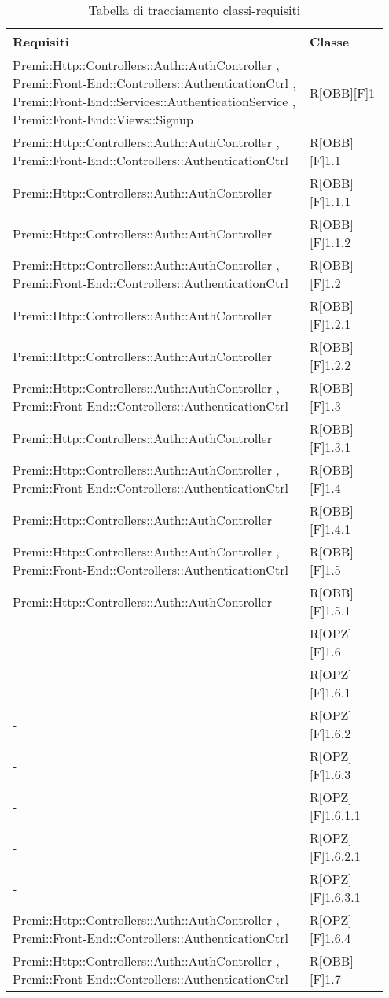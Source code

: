 \newpage
\begin{table}[h]
	\caption{Tabella di tracciamento classi-requisiti}
	\begin{center}
		\begin{tabular}{|p{0.75\linewidth}|p{0.2\linewidth}|}
			\toprule
			\textbf{Requisiti} & \textbf{Classe}\\
		\midrule
			 Premi::Http::Controllers::Auth::AuthController , Premi::Front-End::Controllers::AuthenticationCtrl , Premi::Front-End::Services::AuthenticationService , Premi::Front-End::Views::Signup & R[OBB][F]1 \\
		\midrule
			 Premi::Http::Controllers::Auth::AuthController , Premi::Front-End::Controllers::AuthenticationCtrl & R[OBB][F]1.1 \\
		\midrule
			Premi::Http::Controllers::Auth::AuthController & R[OBB][F]1.1.1 \\
		\midrule
			Premi::Http::Controllers::Auth::AuthController & R[OBB][F]1.1.2 \\
		\midrule
            Premi::Http::Controllers::Auth::AuthController , Premi::Front-End::Controllers::AuthenticationCtrl & R[OBB][F]1.2 \\
		\midrule
			Premi::Http::Controllers::Auth::AuthController & R[OBB][F]1.2.1 \\
		\midrule
		  Premi::Http::Controllers::Auth::AuthController & R[OBB][F]1.2.2 \\
		\midrule
		  Premi::Http::Controllers::Auth::AuthController , Premi::Front-End::Controllers::AuthenticationCtrl & R[OBB][F]1.3 \\
		\midrule
			Premi::Http::Controllers::Auth::AuthController & R[OBB][F]1.3.1 \\
		\midrule
			Premi::Http::Controllers::Auth::AuthController , Premi::Front-End::Controllers::AuthenticationCtrl & R[OBB][F]1.4 \\
		\midrule
			Premi::Http::Controllers::Auth::AuthController & R[OBB][F]1.4.1 \\
		\midrule
			Premi::Http::Controllers::Auth::AuthController , Premi::Front-End::Controllers::AuthenticationCtrl & R[OBB][F]1.5 \\
		\midrule
			Premi::Http::Controllers::Auth::AuthController & R[OBB][F]1.5.1 \\
		\midrule
			 & R[OPZ][F]1.6 \\
		\midrule
			- & R[OPZ][F]1.6.1 \\
		\midrule
			- & R[OPZ][F]1.6.2 \\
		\midrule
			- & R[OPZ][F]1.6.3 \\
		\midrule
			- & R[OPZ][F]1.6.1.1 \\
		\midrule
			- & R[OPZ][F]1.6.2.1 \\
		\midrule
			- & R[OPZ][F]1.6.3.1 \\
		\midrule
			Premi::Http::Controllers::Auth::AuthController , Premi::Front-End::Controllers::AuthenticationCtrl & R[OPZ][F]1.6.4 \\
		\midrule
			Premi::Http::Controllers::Auth::AuthController , Premi::Front-End::Controllers::AuthenticationCtrl & R[OBB][F]1.7 \\
		

\end{tabular}
\end{center}
\end{table}
